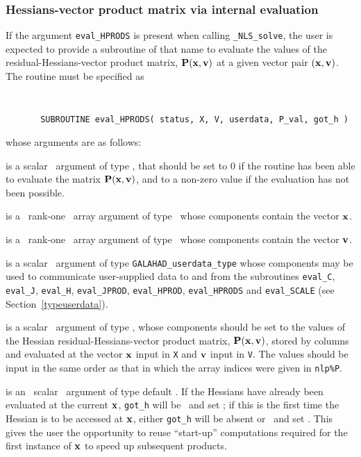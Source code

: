 \documentclass{galahad}
\newcommand{\packagename}{NLS}
\newcommand{\fullpackagename}{\libraryname\_\packagename}
\newcommand{\solver}{{\tt \fullpackagename\_solve}}
\begin{document}

\subsubsection{Hessians-vector product matrix via internal evaluation\label{hpfv}}

If the argument {\tt eval\_HPRODS} is present when calling \solver, the
user is expected to provide a subroutine of that name to evaluate the
values of the residual-Hessians-vector product matrix, ${\mathbf{P}}({\mathbf{x}},{\mathbf{v}})$
at a given vector pair $({\mathbf{x}},{\mathbf{v}})$.
The routine must be specified as
\def\baselinestretch{0.8}
{\tt
\begin{verbatim}
       SUBROUTINE eval_HPRODS( status, X, V, userdata, P_val, got_h )
\end{verbatim} }
\def\baselinestretch{1.0}
\noindent whose arguments are as follows:

\begin{description}
 is a scalar \intentout\ argument of type \integer,
that should be set to 0 if the routine has been able to evaluate the
matrix ${\mathbf{P}}({\mathbf{x}},{\mathbf{v}})$,
and to a non-zero value if the evaluation has not been possible.

 is a \ rank-one \intentin\ array argument of type
\realdp\ whose components contain the vector ${\mathbf{x}}$.

 is a \ rank-one \intentin\ array argument of type
\realdp\ whose components contain the vector ${\mathbf{v}}$.

 is a scalar \intentinout\ argument of type
{\tt GALAHAD\_userdata\_type} whose components may be used
to communicate user-supplied data to and from the subroutines
{\tt eval\_C}, {\tt eval\_J}, {\tt eval\_H}, {\tt eval\_JPROD},
{\tt eval\_HPROD}, {\tt eval\_HPRODS} and {\tt eval\_SCALE}
(see Section~\ref{typeuserdata}).

 is a scalar \intentout\ argument of type \realdp,
whose components should be set to the values of the Hessian
residual-Hessians-vector product matrix, ${\mathbf{P}}({\mathbf{x}},{\mathbf{v}})$,
stored by columns and evaluated at the vector ${\mathbf{x}}$ input in {\tt X}
and ${\mathbf{v}}$ input in {\tt V}.
The values should be input in the same order as that in which the array
indices were given in {\tt nlp\%P}.

 is an \optional\ scalar \intentin\ argument of type default
\logical. If the Hessians have already been evaluated at the current
${\mathbf{x}}$, {\tt got\_h} will be \present\ and set \true; if this is the first time
the Hessian is to be accessed at ${\mathbf{x}}$, either {\tt got\_h} will
be absent or \present\ and set \false. This gives the user the opportunity
to reuse ``start-up'' computations required for the first instance of
${\mathbf{x}}$ to speed up subsequent products.

\end{description}
\end{document}
